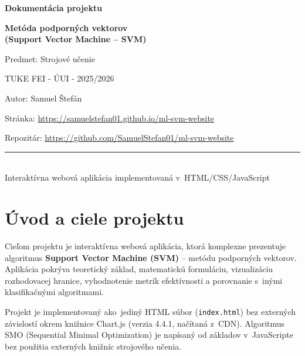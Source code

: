 \documentclass[12pt,a4paper]{article}
\begin{document}
\begin{titlepage}
  \centering
  \vspace*{2cm}
  {\LARGE\bfseries Dokumentácia projektu\par}
  \vspace{0.6cm}
  {\Huge\bfseries Metóda podporných vektorov\\[0.3em]
   \large (Support Vector Machine -- SVM)\par}
  \vspace{1.2cm}
  {\large Predmet: Strojové učenie\par}
  \vspace{0.4cm}
  {\large TUKE FEI - ÚUI - 2025/2026\par}
  \vspace{0.8cm}
  {\large Autor: Samuel Štefán\par}
  \vspace{0.3cm}
  {\large Stránka: \url{https://samuelstefan01.github.io/ml-svm-website}\par}
  \vspace{0.3cm}
  {\small Repozitár: \url{https://github.com/SamuelStefan01/ml-svm-website}\par}
  \vfill
  \rule{\linewidth}{0.5pt}\\[0.4em]
  {\small Interaktívna webová aplikácia implementovaná v~HTML/CSS/JavaScript}
\end{titlepage}

\tableofcontents
\newpage

\section{Úvod a ciele projektu}

Cieľom projektu je interaktívna webová aplikácia, ktorá komplexne prezentuje
algoritmus \textbf{Support Vector Machine (SVM)} -- metódu podporných vektorov.
Aplikácia pokrýva teoretický základ, matematickú formuláciu, vizualizáciu
rozhodovacej hranice, vyhodnotenie metrík efektívnosti a porovnanie s~inými
klasifikačnými algoritmami.

Projekt je implementovaný ako~jediný HTML súbor (\texttt{index.html})
bez externých závislostí okrem knižnice Chart.js (verzia 4.4.1, načítaná z~CDN).
Algoritmus SMO (Sequential Minimal Optimization) je napísaný od základov
v~JavaScripte bez použitia externých knižníc strojového učenia.
\end{document}
